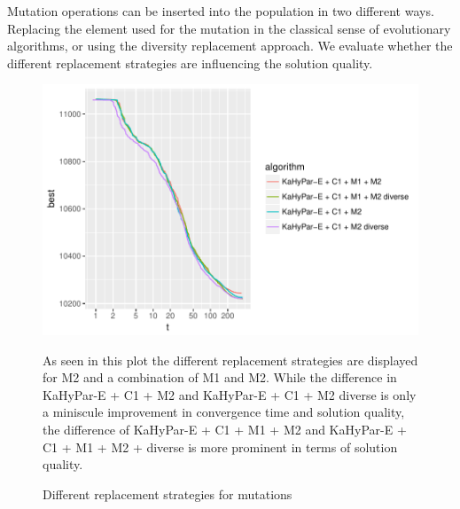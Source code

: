 \documentclass[a4paper,12pt,titlepage, BCOR7mm,headsepline]{scrbook}
\numberwithin{equation}{section}
\begin{document}
Mutation operations can be inserted into the population in two different ways. Replacing the element used for the mutation in the classical sense of evolutionary algorithms, or using the diversity replacement approach. We evaluate whether the different replacement strategies are influencing the solution quality.
\begin{figure}
\caption{Different replacement strategies for mutations}
\begin{center}
\includegraphics{bachelorarbeit-insertrandom}
\end{center}
As seen in this plot the different replacement strategies are displayed for M2 and a combination of M1 and M2. While the difference in KaHyPar-E + C1 + M2 and KaHyPar-E + C1 + M2 diverse is only a miniscule improvement in convergence time and solution quality, the difference of KaHyPar-E + C1 + M1 + M2 and KaHyPar-E + C1 + M1 + M2 + diverse is more prominent in terms of solution quality.

\end{figure}
\end{document}
